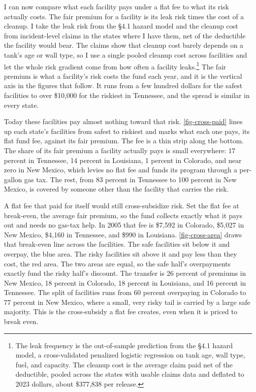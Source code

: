 \documentclass[
  12pt,
]{article}
\begin{document}
I can now compare what each facility pays under a flat fee to what its
risk actually costs. The fair premium for a facility is its leak risk
times the cost of a cleanup. I take the leak risk from the §4.1 hazard
model and the cleanup cost from incident-level claims in the states
where I have them, net of the deductible the facility would bear. The
claims show that cleanup cost barely depends on a tank's age or wall
type, so I use a single pooled cleanup cost across facilities and let
the whole risk gradient come from how often a facility leaks.\footnote{The
  leak frequency is the out-of-sample prediction from the §4.1 hazard
  model, a cross-validated penalized logistic regression on tank age,
  wall type, fuel, and capacity. The cleanup cost is the average claim
  paid net of the deductible, pooled across the states with usable
  claims data and deflated to 2023 dollars, about \$377,838 per release.}
The fair premium is what a facility's risk costs the fund each year, and
it is the vertical axis in the figures that follow. It runs from a few
hundred dollars for the safest facilities to over \$10,000 for the
riskiest in Tennessee, and the spread is similar in every state.

Today these facilities pay almost nothing toward that risk.
\autoref{fig-cross-paid} lines up each state's facilities from safest to
riskiest and marks what each one pays, its flat fund fee, against its
fair premium. The fee is a thin strip along the bottom. The share of its
fair premium a facility actually pays is small everywhere: 17 percent in
Tennessee, 14 percent in Louisiana, 1 percent in Colorado, and near zero
in New Mexico, which levies no flat fee and funds its program through a
per-gallon gas tax. The rest, from 83 percent in Tennessee to 100
percent in New Mexico, is covered by someone other than the facility
that carries the risk.

A flat fee that paid for itself would still cross-subsidize risk. Set
the flat fee at break-even, the average fair premium, so the fund
collects exactly what it pays out and needs no gas-tax help. In 2005
that fee is \$7,592 in Colorado, \$5,027 in New Mexico, \$4,160 in
Tennessee, and \$990 in Louisiana. \autoref{fig-cross-area} draws that
break-even line across the facilities. The safe facilities sit below it
and overpay, the blue area. The risky facilities sit above it and pay
less than they cost, the red area. The two areas are equal, so the safe
half's overpayments exactly fund the risky half's discount. The transfer
is 26 percent of premiums in New Mexico, 18 percent in Colorado, 18
percent in Louisiana, and 16 percent in Tennessee. The split of
facilities runs from 60 percent overpaying in Colorado to 77 percent in
New Mexico, where a small, very risky tail is carried by a large safe
majority. This is the cross-subsidy a flat fee creates, even when it is
priced to break even.
\end{document}
